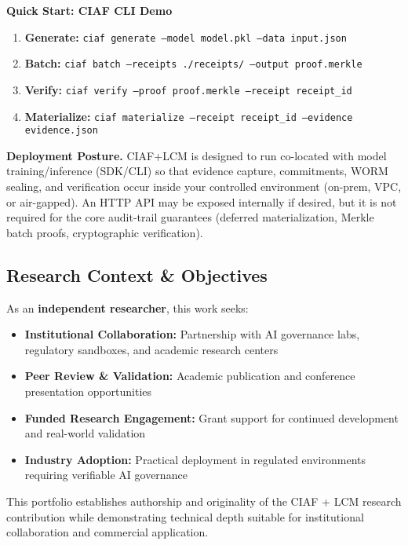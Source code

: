 \documentclass[12pt,a4paper]{article}
\begin{document}
\begin{infobox}
\textbf{Quick Start: CIAF CLI Demo}
\begin{enumerate}
\item \textbf{Generate:} \texttt{ciaf generate --model model.pkl --data input.json}
\item \textbf{Batch:} \texttt{ciaf batch --receipts ./receipts/ --output proof.merkle}
\item \textbf{Verify:} \texttt{ciaf verify --proof proof.merkle --receipt receipt\_id}
\item \textbf{Materialize:} \texttt{ciaf materialize --receipt receipt\_id --evidence evidence.json}
\end{enumerate}
\end{infobox}

\textbf{Deployment Posture.} CIAF+LCM is designed to run co-located with model training/inference (SDK/CLI) so that evidence capture, commitments, WORM sealing, and verification occur inside your controlled environment (on-prem, VPC, or air-gapped). An HTTP API may be exposed internally if desired, but it is not required for the core audit-trail guarantees (deferred materialization, Merkle batch proofs, cryptographic verification).

\subsection{Research Context \& Objectives}

As an \textbf{independent researcher}, this work seeks:

\begin{valuebox}
\begin{itemize}
\item \textbf{Institutional Collaboration:} Partnership with AI governance labs, regulatory sandboxes, and academic research centers
\item \textbf{Peer Review \& Validation:} Academic publication and conference presentation opportunities
\item \textbf{Funded Research Engagement:} Grant support for continued development and real-world validation
\item \textbf{Industry Adoption:} Practical deployment in regulated environments requiring verifiable AI governance
\end{itemize}
\end{valuebox}

This portfolio establishes authorship and originality of the CIAF + LCM research contribution while demonstrating technical depth suitable for institutional collaboration and commercial application.
\end{document}
